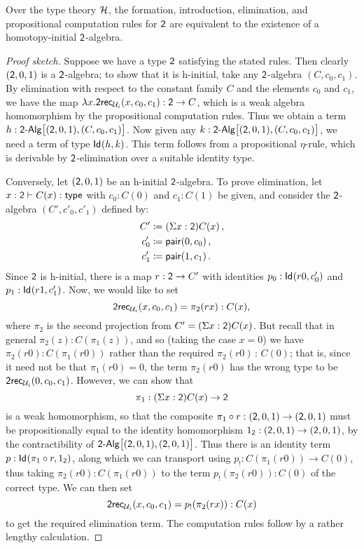 \begin{proposition} \label{prop:2hinitial}
Over the type theory $\mathcal{H}$, the formation, introduction, elimination, and propositional computation rules
for $\mathsf{2}$ are equivalent to the existence of a homotopy-initial $\mathsf{2}$-algebra.
\end{proposition}
\begin{proof}[Proof sketch] 
Suppose we have a type $\mathsf{2}$ satisfying the stated rules.  Then clearly $(\mathsf{2}, 0, 1)$ is a $\mathsf{2}$-algebra; to show that it is h-initial, take any $\mathsf{2}$-algebra $(C,c_0,c_1)$.  By elimination with respect to the constant family $C$ and the elements $c_0$ and $c_1$, we have the map $\lambda x . \mathsf{2rec}_{\mathcal{U}_i}(x, c_0,c_1) : \mathsf{2} \rightarrow C$, which is a weak algebra homomorphism by the propositional computation rules.  Thus we obtain a term $h:\BoolAlg\big[ (\Bool, 0, 1), (C, c_0,c_1)\big]$.  Now given any $k:\BoolAlg\big[ (\Bool, 0, 1), (C, c_0,c_1)\big]$, we need a term of type $\mathsf{Id}_{}(h,k)$.  This term follows from a propositional $\eta$-rule, which is derivable by $\mathsf{2}$-elimination over a suitable identity type.

Conversely, let $(\mathsf{2}, 0, 1)$ be an h-initial $\mathsf{2}$-algebra.  To prove elimination, let $x:\mathsf{2} \vdash C(x):\mathsf{type}$ with $c_0 : C(0)$ and $ c_1 : C(1)$ be given, and consider the $\mathsf{2}$-algebra $(C', c'_0, c'_1)$ defined by:
%
\begin{align*}
C' &\coloneqq (\Sigma x: \mathsf{2})C(x) \, , \\
c'_0 &\coloneqq \mathsf{pair}(0, c_0) \, , \\
c'_1 &\coloneqq \mathsf{pair}(1, c_1)\, .
\end{align*}
%
Since $\mathsf{2}$ is h-initial, there is a map $r : \mathsf{2}\rightarrow C'$ with identities $p_0:\mathsf{Id}_{}(r  0, c'_0)$ and $p_1:\mathsf{Id}_{}(r  1, c'_1)$.  Now, we would like to set 
$$\mathsf{2rec}_{\mathcal{U}_i}(x, c_0, c_1) = \pi_2 (r x) : C(x),$$
 where $\pi_2$ is the second projection from $C'=(\Sigma x: \mathsf{2})C(x)$.  But recall that in general 
 $\pi_2(z) : C(\pi_1(z))$, and so (taking the case $x=0$) we have $\pi_2(r   0) : C(\pi_1(r   0))$ rather than the required $\pi_2(r   0) {\, : \, } C(0)$; that is, since it need not be that $\pi_1(r   0) = 0$, the term $\pi_2(r   0)$ has the wrong type to be $\mathsf{2rec}_{\mathcal{U}_i}(0, c_0, c_1)$.  However, we can show that $$\pi_1: (\Sigma x: \mathsf{2})C(x)\rightarrow \mathsf{2}$$ is a weak homomorphism, so that the composite $\pi_1\circ r : (\mathsf{2}, 0, 1)\rightarrow (\mathsf{2}, 0, 1)$ must be propositionally equal to the identity homomorphism $1_{\mathsf{2}} : (\mathsf{2}, 0, 1)\rightarrow (\mathsf{2}, 0, 1)$, by the contractibility of $\BoolAlg \big[ (\Bool, 0, 1), (\Bool, 0, 1)\big]$.  Thus there is an identity term $p : \mathsf{Id}_{}(\pi_1\circ r, 1_{\mathsf{2}})$, along which we can transport using $p_! : C(\pi_1( r   0)) \rightarrow C(0)$, thus taking $\pi_2(r   0 ) : C(\pi_1 (r   0))$ to the term  $p_! ( \pi_2( r   0) ) :C(0)$ of the correct type.  We can then set
\[
\mathsf{2rec}_{\mathcal{U}_i}(x, c_0, c_1) = p_! (\pi_2 (r x)) : C(x)
\]
to get the required elimination term.  The computation rules follow by a rather lengthy calculation.
\end{proof}

